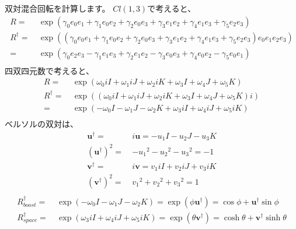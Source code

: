 \documentclass[a4paper,12pt,notitlepage]{jsreport}
\begin{document}
双対混合回転を計算します。
$ Cl(1,3) $で考えると、
\begin{equation}
  \begin{split}
    R = ~ & \exp(\gamma_0 e_0e_1 + \gamma_1 e_0e_2 + \gamma_2 e_0e_3
    + \gamma_3 e_1e_2 + \gamma_4 e_1e_3 + \gamma_5 e_2e_3) \\
    R^\dag = ~ & \exp((\gamma_0 e_0e_1 + \gamma_1 e_0e_2 + \gamma_2 e_0e_3
    + \gamma_3 e_1e_2 + \gamma_4 e_1e_3 + \gamma_5 e_2e_3)e_0e_1e_2e_3) \\
    = ~ & \exp(\gamma_0 e_2e_3 - \gamma_1 e_1e_3 + \gamma_2 e_1e_2
    - \gamma_3 e_0e_3 + \gamma_4 e_0e_2 - \gamma_5 e_0e_1) \\
  \end{split}
\end{equation}
四双四元数で考えると、
\begin{equation}
  \begin{split}
    R = ~ & \exp(\omega_0 iI + \omega_1 iJ + \omega_2 iK + \omega_3 I + \omega_4 J + \omega_5 K) \\
    R^\dag = ~ & \exp((\omega_0 iI + \omega_1 iJ + \omega_2 iK + \omega_3 I + \omega_4 J + \omega_5 K)i) \\
    = ~ & \exp(- \omega_0 I - \omega_1 J - \omega_2 K + \omega_3 iI + \omega_4 iJ + \omega_5 iK) \\
  \end{split}
\end{equation}
ベルソルの双対は、
\begin{equation}
  \begin{split}
    \bm{u}^\dag = ~ & i \bm{u} = - u_1 I - u_2 J - u_3 K \\
    (\bm{u}^\dag)^2 = ~ & - {u_1}^2 - {u_2}^2 - {u_3}^2 = -1 \\
    \bm{v}^\dag = ~ & i \bm{v} = v_1 iI + v_2 iJ + v_3 iK \\
    (\bm{v}^\dag)^2 = ~ & {v_1}^2 + {v_2}^2 + {v_3}^2 = 1 \\
  \end{split}
\end{equation}
\begin{equation}
  \begin{split}
    R_{boost}^\dag = ~ & \exp(- \omega_0 I - \omega_1 J - \omega_2 K)
    = \exp ( \phi \bm{u}^\dag )
    = \cos \phi + \bm{u}^\dag \sin \phi \\
    R_{space}^\dag = ~ & \exp(\omega_3 iI + \omega_4 iJ + \omega_5 iK)
    = \exp ( \theta \bm{v}^\dag )
    = \cosh \theta + \bm{v}^\dag \sinh \theta \\
  \end{split}
\end{equation}
\end{document}
